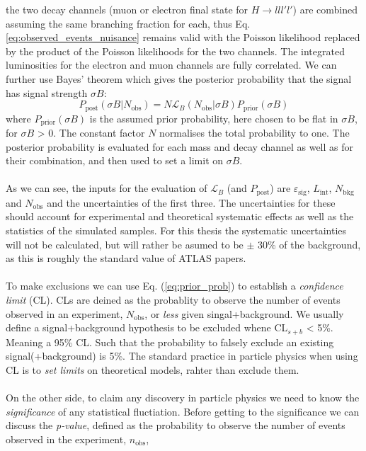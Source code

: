 \documentclass[14pt, a4paper]{book}
\begin{document}
the two decay channels (muon or electron final state for $H\rightarrow lll'l'$) are combined assuming the same branching fraction for each, thus Eq. \ref{eq:observed_events_nuisance} remains valid with the Poisson likelihood replaced by the product of the Poisson likelihoods for the two channels. 
The integrated luminosities for the electron and muon channels are fully correlated. We can further use Bayes' theorem which gives the posterior probability that the signal has signal strength $\sigma B$:
\begin{equation}\label{eq:prior_prob}
    P_{\text{post}}(\sigma B\vert N_{\text{obs}}) = N \mathcal{L}_B (N_{\text{obs}}\vert\sigma B) P_{\text{prior}}(\sigma B)
\end{equation}
where $P_{\text{prior}}(\sigma B)$ is the assumed prior probability, here chosen to be flat in $\sigma B$, for $\sigma B$ > 0. The constant factor $N$ normalises the total probability to one. The posterior probability is evaluated for each mass and decay channel as well as for their 
combination, and then used to set a limit on $\sigma B$.\\
\\As we can see, the inputs for the evaluation of $\mathcal{L}_B$ (and $P_{\text{post}}$) are $\varepsilon_{\text{sig}}$, $L_{\text{int}}$, $N_{\text{bkg}}$ and $N_{\text{obs}}$ and the uncertainties of the first three. The uncertainties for these should account for experimental 
and theoretical systematic effects as well as the statistics of the simulated samples. For this thesis the systematic uncertainties will not be calculated, but will rather be asumed to be $\pm$ 30\% of the background, as this is roughly the standard value of ATLAS papers.\\
\\To make exclusions we can use Eq. (\ref{eq:prior_prob}) to establish a \textit{confidence limit} (CL). CLs are deined as the probablity to observe the number of events observed in an experiment, $N_{\text{obs}}$, or \textit{less} given singal+background. We usually define a signal+background 
hypothesis to be excluded whene CL$_{s+b}$ < 5\%. Meaning a 95\% CL. Such that the probability to falsely exclude an existing signal(+background) is 5\%. The standard practice in particle physics when using CL is to \textit{set limits} on theoretical models, rahter than exclude them.\\
\\On the other side, to claim any discovery in particle physics we need to know the \textit{significance} of any statistical fluctiation. Before getting to the significance we can discuss the \textit{p-value}, defined as the probability to observe the number of events observed in the experiment, $n_{\text{obs}}$, 
\end{document}
